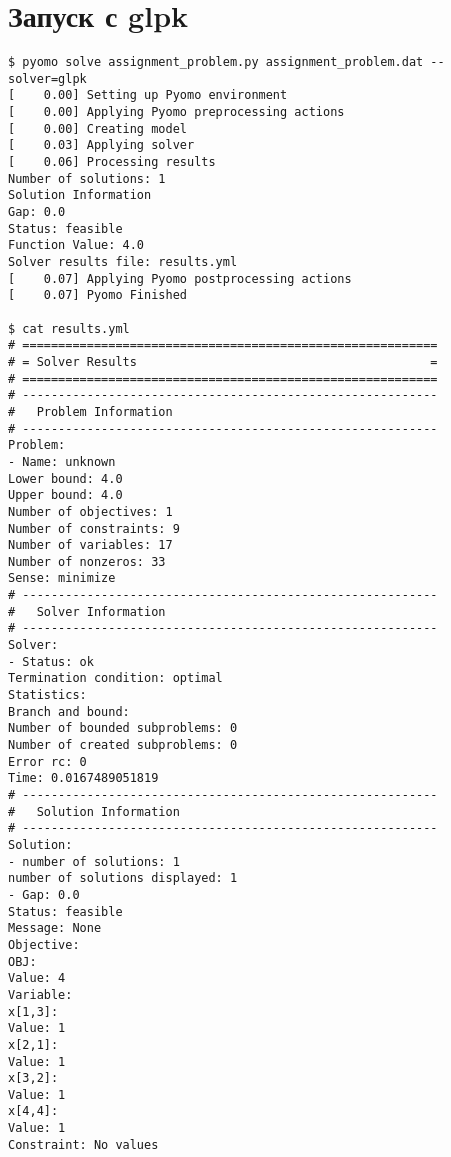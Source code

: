 \documentclass[a4paper]{article}
\begin{document}
\section*{Запуск с glpk}
\begin{verbatim}
$ pyomo solve assignment_problem.py assignment_problem.dat --solver=glpk
[    0.00] Setting up Pyomo environment
[    0.00] Applying Pyomo preprocessing actions
[    0.00] Creating model
[    0.03] Applying solver
[    0.06] Processing results
Number of solutions: 1
Solution Information
Gap: 0.0
Status: feasible
Function Value: 4.0
Solver results file: results.yml
[    0.07] Applying Pyomo postprocessing actions
[    0.07] Pyomo Finished

$ cat results.yml
# ==========================================================
# = Solver Results                                         =
# ==========================================================
# ----------------------------------------------------------
#   Problem Information
# ----------------------------------------------------------
Problem: 
- Name: unknown
Lower bound: 4.0
Upper bound: 4.0
Number of objectives: 1
Number of constraints: 9
Number of variables: 17
Number of nonzeros: 33
Sense: minimize
# ----------------------------------------------------------
#   Solver Information
# ----------------------------------------------------------
Solver: 
- Status: ok
Termination condition: optimal
Statistics: 
Branch and bound: 
Number of bounded subproblems: 0
Number of created subproblems: 0
Error rc: 0
Time: 0.0167489051819
# ----------------------------------------------------------
#   Solution Information
# ----------------------------------------------------------
Solution: 
- number of solutions: 1
number of solutions displayed: 1
- Gap: 0.0
Status: feasible
Message: None
Objective:
OBJ:
Value: 4
Variable:
x[1,3]:
Value: 1
x[2,1]:
Value: 1
x[3,2]:
Value: 1
x[4,4]:
Value: 1
Constraint: No values
\end{verbatim}
\end{document}
